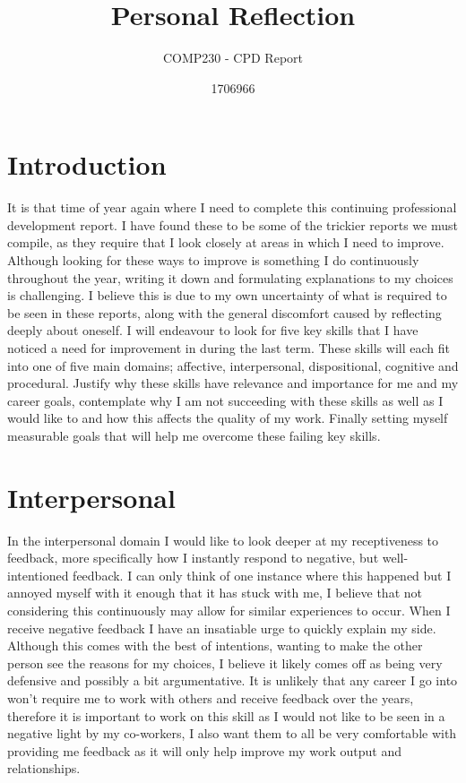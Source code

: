 \documentclass{scrartcl}
\title{Personal Reflection}
\subtitle{COMP230 - CPD Report}
\author{1706966}
\begin{document}
\maketitle

\section{Introduction}
It is that time of year again where I need to complete this continuing professional development report. I have found these to be some of the trickier reports we must compile, as they require that I look closely at areas in which I need to improve. Although looking for these ways to improve is something I do continuously throughout the year, writing it down and formulating explanations to my choices is challenging. I believe this is due to my own uncertainty of what is required to be seen in these reports, along with the general discomfort caused by reflecting deeply about oneself.
I will endeavour to look for five key skills that I have noticed a need for improvement in during the last term. These skills will each fit into one of five main domains; affective, interpersonal, dispositional, cognitive and procedural. Justify why these skills have relevance and importance for me and my career goals, contemplate why I am not succeeding with these skills as well as I would like to and how this affects the quality of my work. Finally setting myself measurable goals that will help me overcome these failing key skills.

\section{Interpersonal}
In the interpersonal domain I would like to look deeper at my receptiveness to feedback, more specifically how I instantly respond to negative, but well-intentioned feedback. I can only think of one instance where this happened but I annoyed myself with it enough that it has stuck with me, I believe that not considering this continuously may allow for similar experiences to occur. When I receive negative feedback I have an insatiable urge to quickly explain my side. Although this comes with the best of intentions, wanting to make the other person see the reasons for my choices, I believe it likely comes off as being very defensive and possibly a bit argumentative. 
It is unlikely that any career I go into won't require me to work with others and receive feedback over the years, therefore it is important to work on this skill as I would not like to be seen in a negative light by my co-workers, I also want them to all be very comfortable with providing me feedback as it will only help improve my work output and relationships.
\end{document}
